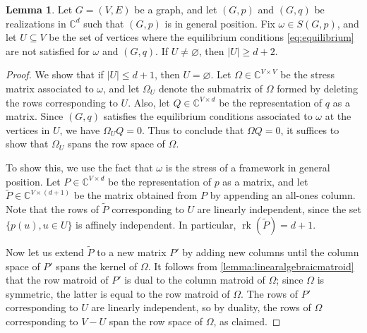 \documentclass[11pt,a4paper,dvipsnames]{scrartcl}
\theoremstyle{definition}
\newtheorem{lemma}[theorem]{Lemma}
\DeclareMathOperator{\rk}{rk}
\newcommand{\CC}{\mathbb{C}}
\begin{document}
\begin{lemma}\label{lemma:stressalmosteveryvertex}
     Let $G = (V,E)$ be a graph, and let $(G,p)$ and $(G,q)$ be realizations in $\CC^d$ such that $(G,p)$ is in general position. Fix $\omega \in S(G,p)$, and let $U \subseteq V$ be the set of vertices where the equilibrium conditions \cref{eq:equilibrium} are not satisfied for $\omega$ and $(G,q)$. If $U\neq \varnothing$, then  $|U| \geq d+2$.
\end{lemma}
\begin{proof}
    We show that if $|U| \leq d+1$, then $U = \varnothing$. Let $\Omega \in \CC^{V \times V}$ be the stress matrix associated to $\omega$, and let $\Omega_U$ denote the submatrix of $\Omega$ formed by deleting the rows corresponding to $U$. Also, let $Q \in \CC^{V \times d}$ be the representation of $q$ as a matrix. Since $(G,q)$ satisfies the equilibrium conditions associated to $\omega$ at the vertices in $U$, we have $\Omega_U Q = 0$. Thus to conclude that $\Omega Q = 0$, it suffices to show that $\Omega_U$ spans the row space of $\Omega$.%
    
    To show this, we use the fact that $\omega$ is the stress of a framework in general position.
    Let $P \in \CC^{V \times d}$ be the representation of $p$ as a matrix, and let $\widetilde{P} \in \CC^{V \times (d+1)}$ be the matrix obtained from $P$ by appending an all-ones column. Note that the rows of $\widetilde{P}$ corresponding to $U$ are linearly independent, since the set $\{p(u), u \in U\}$ is affinely independent. In particular, $\rk(\widetilde{P}) = d+1$.

    Now let us extend $\widetilde{P}$ to a new matrix $P'$ by adding new columns until the column space of $P'$ spans the kernel of $\Omega$. It follows from \cref{lemma:linearalgebraicmatroid} that the row matroid of $P'$ is dual to the column matroid of $\Omega$; since $\Omega$ is symmetric, the latter is equal to the row matroid of $\Omega$. The rows of $P'$ corresponding to $U$ are linearly independent, so by duality, the rows of $\Omega$ corresponding to $V - U$ span the row space of $\Omega$, as claimed. %
\end{proof}
\end{document}
